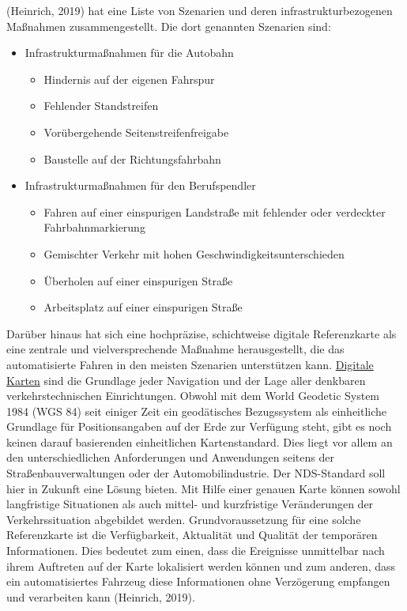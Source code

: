 \documentclass[
]{book}
\providecommand{\tightlist}{%
  \setlength{\itemsep}{0pt}\setlength{\parskip}{0pt}}
\begin{document}
(Heinrich, 2019) hat eine Liste von Szenarien und deren infrastrukturbezogenen Maßnahmen zusammengestellt. Die dort genannten Szenarien sind:

\begin{itemize}
\tightlist
\item
  Infrastrukturmaßnahmen für die Autobahn

  \begin{itemize}
  \tightlist
  \item
    Hindernis auf der eigenen Fahrspur
  \item
    Fehlender Standstreifen
  \item
    Vorübergehende Seitenstreifenfreigabe
  \item
    Baustelle auf der Richtungsfahrbahn
  \end{itemize}
\item
  Infrastrukturmaßnahmen für den Berufspendler

  \begin{itemize}
  \tightlist
  \item
    Fahren auf einer einspurigen Landstraße mit fehlender oder verdeckter Fahrbahnmarkierung
  \item
    Gemischter Verkehr mit hohen Geschwindigkeitsunterschieden
  \item
    Überholen auf einer einspurigen Straße
  \item
    Arbeitsplatz auf einer einspurigen Straße
  \end{itemize}
\end{itemize}

Darüber hinaus hat sich eine hochpräzise, schichtweise digitale Referenzkarte als eine zentrale und vielversprechende Maßnahme herausgestellt, die das automatisierte Fahren in den meisten Szenarien unterstützen kann. \protect\hyperlink{digital_maps}{Digitale Karten} sind die Grundlage jeder Navigation und der Lage aller denkbaren verkehrstechnischen Einrichtungen. Obwohl mit dem World Geodetic System 1984 (WGS 84) seit einiger Zeit ein geodätisches Bezugssystem als einheitliche Grundlage für Positionsangaben auf der Erde zur Verfügung steht, gibt es noch keinen darauf basierenden einheitlichen Kartenstandard. Dies liegt vor allem an den unterschiedlichen Anforderungen und Anwendungen seitens der Straßenbauverwaltungen oder der Automobilindustrie. Der NDS-Standard soll hier in Zukunft eine Lösung bieten. Mit Hilfe einer genauen Karte können sowohl langfristige Situationen als auch mittel- und kurzfristige Veränderungen der Verkehrssituation abgebildet werden. Grundvoraussetzung für eine solche Referenzkarte ist die Verfügbarkeit, Aktualität und Qualität der temporären Informationen. Dies bedeutet zum einen, dass die Ereignisse unmittelbar nach ihrem Auftreten auf der Karte lokalisiert werden können und zum anderen, dass ein automatisiertes Fahrzeug diese Informationen ohne Verzögerung empfangen und verarbeiten kann (Heinrich, 2019).
\end{document}
